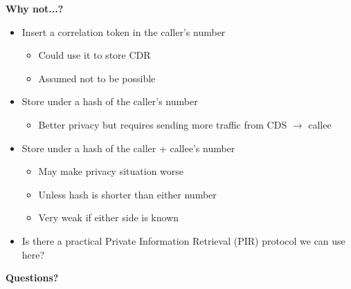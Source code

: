 \documentclass[helvetica]{seminar}
\newcommand{\heading}[1]{%
  \begin{center} 
    \large\bf 
    #1 
  \end{center} 
  \vspace{.4 in}}
\begin{document}
\begin{slide}
\heading{Why not...?}

\vspace{-.2in}
\begin{itemize}
\item Insert a correlation token in the caller's number
  \begin{itemize}
  \item Could use it to store CDR
  \item Assumed not to be possible
  \end{itemize}

\item Store under a hash of the caller's number
  \begin{itemize}
  \item Better privacy but requires sending more traffic from CDS $\rightarrow$ callee
  \end{itemize}

\item Store under a hash of the caller + callee's number
  \begin{itemize}
  \item May make privacy situation worse
  \item Unless hash is shorter than either number
  \item Very weak if either side is known
  \end{itemize}

\item Is there a practical Private Information Retrieval (PIR) protocol we can use here?
\end{itemize}

\end{slide}

\begin{slide}
\heading{Questions?}
\end{slide}
\end{document}
